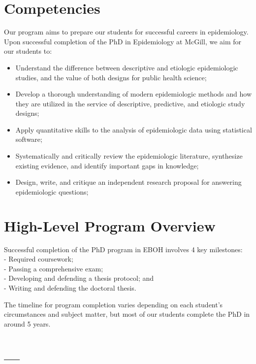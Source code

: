 \documentclass[
]{book}
\providecommand{\tightlist}{%
  \setlength{\itemsep}{0pt}\setlength{\parskip}{0pt}}
\begin{document}
\hypertarget{competencies}{%
\section{Competencies}\label{competencies}}

Our program aims to prepare our students for successful careers in epidemiology. Upon successful completion of the PhD in Epidemiology at McGill, we aim for our students to:

\begin{itemize}
\tightlist
\item
  Understand the difference between descriptive and etiologic epidemiologic studies, and the value of both designs for public health science;
\item
  Develop a thorough understanding of modern epidemiologic methods and how they are utilized in the service of descriptive, predictive, and etiologic study designs;
\item
  Apply quantitative skills to the analysis of epidemiologic data using statistical software;
\item
  Systematically and critically review the epidemiologic literature, synthesize existing evidence, and identify important gaps in knowledge;
\item
  Design, write, and critique an independent research proposal for answering epidemiologic questions;
\end{itemize}

\hypertarget{high-level-program-overview}{%
\section{High-Level Program Overview}\label{high-level-program-overview}}

Successful completion of the PhD program in EBOH involves 4 key milestones:\\
- Required coursework;\\
- Passing a comprehensive exam;\\
- Developing and defending a thesis protocol; and\\
- Writing and defending the doctoral thesis.

The timeline for program completion varies depending on each student's circumstances and subject matter, but most of our students complete the PhD in around 5 years.

\hypertarget{section-1}{%
\section{---}\label{section-1}}
\end{document}
